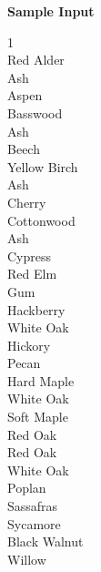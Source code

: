 \begin{flushleft}
{\color{red} \textbf{Sample Input}}
\end{flushleft}
\begin{flushleft}
1\\
\bigskip
Red Alder\\
Ash\\
Aspen\\
Basswood\\
Ash\\
Beech\\
Yellow Birch\\
Ash\\
Cherry\\
Cottonwood\\
Ash\\
Cypress\\
Red Elm\\
Gum\\
Hackberry\\
White Oak\\
Hickory\\
Pecan\\
Hard Maple\\
White Oak\\
Soft Maple\\
Red Oak\\
Red Oak\\
White Oak\\
Poplan\\
Sassafras\\
Sycamore\\
Black Walnut\\
Willow\\
\end{flushleft}

